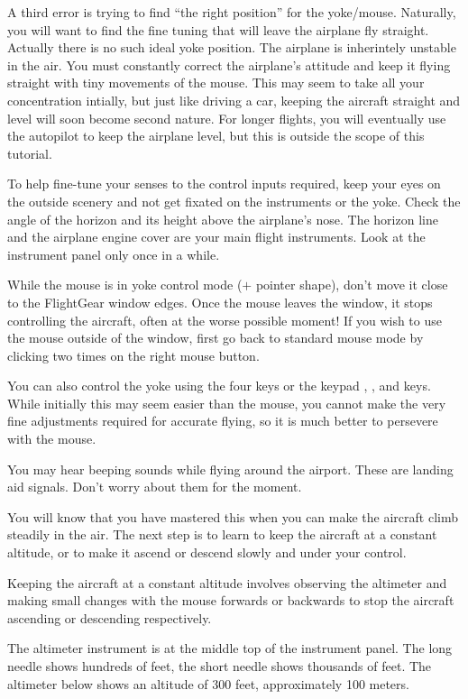 A third error is trying to find ``the right position'' for the
yoke/mouse. Naturally, you will want to find the fine tuning that will leave 
the airplane fly straight. Actually there is no such ideal yoke
position. The airplane is inherintely unstable in the air. You must constantly 
correct the airplane's attitude and keep it flying straight with tiny movements
of the mouse. This may seem to take all your concentration intially,
but just like driving a car, keeping the aircraft straight and level will soon
become second nature. For longer flights, you will eventually use the autopilot
to keep the airplane level, but this is outside the scope of this tutorial. 

To help fine-tune your senses to the control inputs required, keep your eyes on 
the outside scenery and not get fixated on the instruments or the yoke. Check 
the angle of the horizon and its height above the airplane's nose. The horizon 
line and the airplane engine cover are your main flight instruments. Look at
the instrument panel only once in a while.

While the mouse is in yoke control mode
($+$ pointer shape), don't move it close to the FlightGear window
edges. Once the mouse leaves the window, it stops controlling the aircraft,
often at the worse possible moment!
If you wish to use the mouse outside of the window, first go back to standard 
mouse mode by clicking two times on the right mouse button.

You can also control the yoke using the four  keys
or the keypad , ,  and  keys. While initially this
may seem easier than the mouse, you cannot make the very fine adjustments
required for accurate flying, so it is much better to persevere with the mouse.

You may hear beeping sounds while flying around the airport. These are
landing aid signals. Don't worry about them for the
moment.

You will know that you have mastered this when you can make the aircraft climb
steadily in the air. The next step is to learn to keep the aircraft at a 
constant altitude, or to make it ascend or descend slowly and under your 
control.

Keeping the aircraft at a constant altitude involves observing the altimeter
and making small changes with the mouse forwards or backwards to stop the 
aircraft ascending or descending respectively.

 The altimeter instrument is at the middle top of the 
instrument panel. The long needle shows hundreds of feet, the short needle 
shows thousands of feet. The altimeter below shows an altitude of
300 feet, approximately 100 meters.


